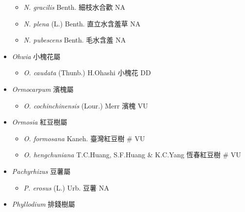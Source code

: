 \begin{itemize}
  \begin{itemize}
        \item[] \textit{N. gracilis} Benth.  細枝水合歡   NA
        \item[] \textit{N. plena} (L.) Benth.  直立水含羞草   NA
        \item[] \textit{N. pubescens} Benth.  毛水含羞   NA
  \end{itemize}
 \item[] \textit{Ohwia} 小槐花屬
                                
  \begin{itemize}
        \item[] \textit{O. caudata} (Thunb.) H.Ohashi  小槐花   DD
  \end{itemize}
 \item[] \textit{Ormocarpum} 濱槐屬
                                
  \begin{itemize}
        \item[] \textit{O. cochinchinensis} (Lour.) Merr  濱槐   VU
  \end{itemize}
 \item[] \textit{Ormosia} 紅豆樹屬
                                
  \begin{itemize}
        \item[] \textit{O. formosana} Kaneh.  臺灣紅豆樹  \# VU
        \item[] \textit{O. hengchuniana} T.C.Huang, S.F.Huang \& K.C.Yang  恆春紅豆樹  \# VU
  \end{itemize}
 \item[] \textit{Pachyrhizus} 豆薯屬
                                
  \begin{itemize}
        \item[] \textit{P. erosus} (L.) Urb.  豆薯   NA
  \end{itemize}
 \item[] \textit{Phyllodium} 排錢樹屬
                                

\end{itemize}
